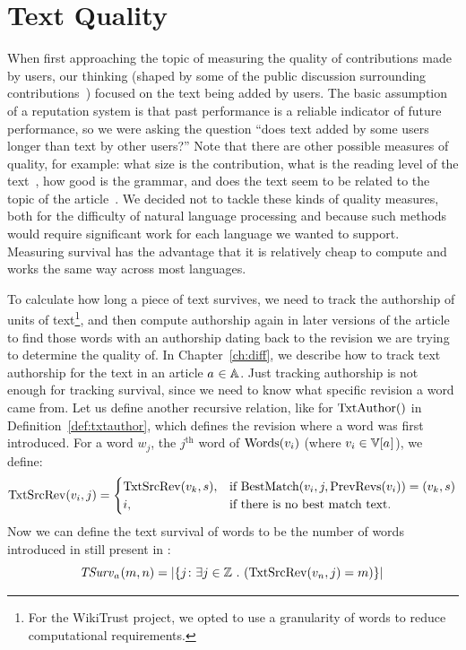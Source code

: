 \section{Text Quality}
\label{sec:textquality}

When first approaching the topic of measuring the quality
of contributions made by users, our thinking (shaped
by some of the public discussion surrounding
contributions~\cite{Swartz2006})
focused on the text being added by users.
The basic assumption of a reputation system is that past performance
is a reliable indicator of future performance, so we were
asking the question ``does text added by some users 
longer than text by other users?''
Note that there are other possible measures of quality, for example:
what size is the contribution, what is the reading level of the
text~\cite{Flesch1948,Gunning1952},
how good is the grammar, and does the text seem to be related to
the topic of the article~\cite{Itakura2009}.
We decided not to tackle these kinds of quality measures, both for
the difficulty of natural language processing and because such
methods would require significant work for each language we wanted
to support.
Measuring survival has the advantage that it is relatively cheap to
compute and works the same way across most languages.

To calculate how long a piece of text survives,
we need to track the authorship of
units of text\footnote{For the WikiTrust project, we opted to
use a granularity of words to reduce computational requirements.},
and then compute authorship again in later
versions of the article to find those words with an
authorship dating back to the revision we are trying
to determine the quality of.
In Chapter~\ref{ch:diff}, we describe how to track text authorship
for the text in an article $a_{} \in \mathbb{A}$.
Just tracking authorship is not enough for tracking survival, since
we need to know what specific revision a word came from.
Let us define another recursive relation, like
for $\mathrm{TxtAuthor}()$ in Definition~\ref{def:txtauthor},
which defines the revision where a word was first introduced.
For a word $w_j$, the $j^{\text{th}}$ word of $\mathrm{Words}(v_{i})$ (where
$\version{i} \in \versions{\article{}}$), we define:
\begin{equation*}
\mathrm{TxtSrcRev}(v_{i}, j) =
    \begin{cases}
        \mathrm{TxtSrcRev}(v_{k}, s), & \text{if}
        \ \mathrm{BestMatch}(v_{i}, j, \mathrm{PrevRevs}(v_{i})) = (v_{k}, s) \\
        i, & \text{if there is no best match text.} \\
    \end{cases}
\end{equation*}
Now we can define the text survival of words to be the number of
words introduced in  still present in :
\begin{equation}
\tsurv{\article{}}{m,n} = \left| \left\{ j \colon
    \exists j \in \mathbb{Z}~.~( \txtsrcrev{\version{n},j} = m ) \right\} \right| \\
\label{eq:tsurv}
\end{equation}

